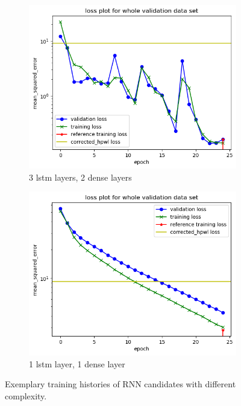 \begin{figure}
	\centering
	\begin{subfigure}[b]{0.45\linewidth}
		\includegraphics[width=\linewidth]{plots/rnn-training-history-3_lstm_layers_2_dense_layers_inflating.png}
		\caption{3 lstm layers, 2 dense layers}
		\label{fig:rnn-training-overfit}
	\end{subfigure}
	\begin{subfigure}[b]{0.45\linewidth}
		\includegraphics[width=\linewidth]{plots/rnn-training-history-1_lstm_layers_1_dense_layers_inflating.png}
		\caption{1 lstm layer, 1 dense layer}
		\label{fig:rnn-training-simple}
	\end{subfigure}
	\caption{Exemplary training histories of \gls{RNN} candidates with different complexity.}
	\label{fig:rnn-training}
\end{figure}

